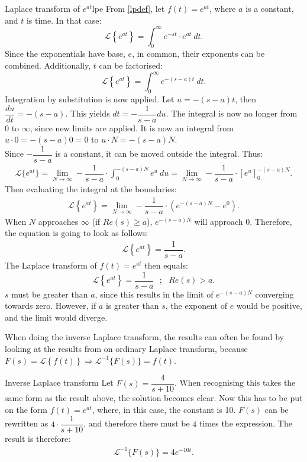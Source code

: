 \begin{example}{Laplace transform of $e^{at}$}{lpe}
From \cref{lpdef}, let $f(t)=e^{at}$, where $a$ is a constant, and $t$ is time. In that case:
$$\mathcal{L} \left\{e^{at} \right\}=\int_{0}^{\infty} e^{-st}\cdot e^{at}\ dt.$$
Since the exponentials have base, $e$, in common, their exponents can be combined. Additionally, $t$ can be factorised:
$$\mathcal{L} \left\{e^{at} \right\}=\int_{0}^{\infty} e^{-(s-a)t}\ dt.$$
Integration by substitution is now applied. Let $u = -(s-a)t$, then $\dfrac{du}{dt}=-(s-a)$. This yields $dt=-\dfrac{1}{s-a}du$. The integral is now no longer from 0 to $\infty$, since new limits are applied. It is now an integral from $u \cdot 0=-(s-a)0=0$ to $u\cdot N=-(s-a)N$.
\\
Since $-\dfrac{1}{s-a}$ is a constant, it can be moved outside the integral. Thus:
\begin{align*}
\mathcal{L}\{e^{at}\}=\lim_{N \to \infty} -\dfrac{1}{s-a} \cdot \int_{0}^{-(s-a)N} e^{u} \ du = \lim_{N \to \infty} -\dfrac{1}{s-a} \cdot \left[e^{u} \right]_{0}^{-(s-a)N}.
\end{align*}
Then evaluating the integral at the boundaries:
\begin{align*}
\mathcal{L} \left\{e^{at} \right\} =\lim_{N \to \infty} -\dfrac{1}{s-a}\cdot (e^{-(s-a)N}-e^{0}).
\end{align*}
When $N$ approaches $\infty$ (if $Re(s) \geq a$), $e^{-(s-a)N}$ will approach $0$. Therefore, the equation is going to look as follows:
\begin{align*}
\mathcal{L} \left\{e^{at} \right\} = \dfrac{1}{s-a}.
\end{align*}
The Laplace transform of $f(t)=e^{at}$ then equals:
$$\mathcal{L} \left\{e^{at} \right\} =\dfrac{1}{s-a} \ \ \ ;\ \ \ Re(s)>a.$$
$s$ must be greater than $a$, since this results in the limit of $e^{-(s-a)N}$ converging towards zero. However, if $a$ is greater than $s$, the exponent of $e$ would be positive, and the limit would diverge.
\end{example}
\noindent When doing the inverse Laplace transform, the results can often be found by looking at the results from on ordinary Laplace transform, because $F(s) = \mathcal{L}\left\{f(t)\right\} \Rightarrow\mathcal{L}^{-1}\big\{ F(s)\big\} = f(t)$.
\\
\begin{example}{Inverse Laplace transform}{}
Let $F(s) = \dfrac{4}{s+10}$. When recognising this takes the same form as the result above, the solution becomes clear. Now this has to be put on the form $f(t)=e^{at}$, where, in this case, the constant is 10. $F(s)$ can be rewritten as $4 \cdot \dfrac{1}{s+10}$, and therefore there must be $4$ times the expression. The result is therefore:
\begin{align*}
\mathcal{L}^{-1} \big\{F(s) \big\} = 4e^{-10t}.
\end{align*}
\end{example}

